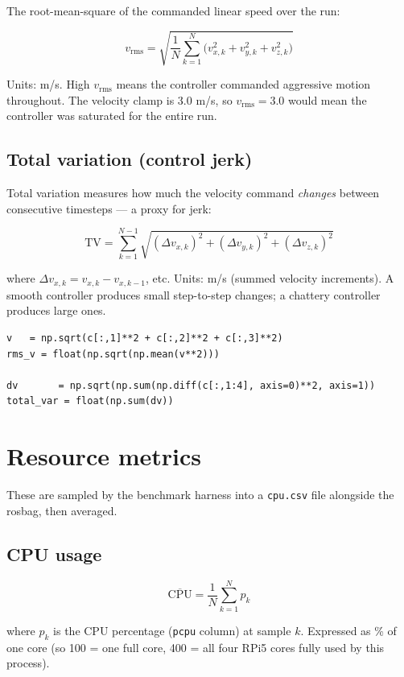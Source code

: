 \documentclass[11pt,a4paper]{article}
\begin{document}
The root-mean-square of the commanded linear speed over the run:

\[
  v_{\mathrm{rms}} = \sqrt{\frac{1}{N} \sum_{k=1}^{N} \bigl(v_{x,k}^2 + v_{y,k}^2 + v_{z,k}^2\bigr)}
\]

Units: m/s.  High $v_{\mathrm{rms}}$ means the controller commanded aggressive
motion throughout.  The velocity clamp is 3.0 m/s, so $v_{\mathrm{rms}} = 3.0$
would mean the controller was saturated for the entire run.

\subsection{Total variation (control jerk)}

Total variation measures how much the velocity command \emph{changes} between
consecutive timesteps --- a proxy for jerk:

\[
  \mathrm{TV} = \sum_{k=1}^{N-1}
      \sqrt{(\Delta v_{x,k})^2 + (\Delta v_{y,k})^2 + (\Delta v_{z,k})^2}
\]

where $\Delta v_{x,k} = v_{x,k} - v_{x,k-1}$, etc.
Units: m/s (summed velocity increments).  A smooth controller produces small
step-to-step changes; a chattery controller produces large ones.

\begin{lstlisting}
v   = np.sqrt(c[:,1]**2 + c[:,2]**2 + c[:,3]**2)
rms_v = float(np.sqrt(np.mean(v**2)))

dv       = np.sqrt(np.sum(np.diff(c[:,1:4], axis=0)**2, axis=1))
total_var = float(np.sum(dv))
\end{lstlisting}

\section{Resource metrics}

These are sampled by the benchmark harness into a \texttt{cpu.csv} file
alongside the rosbag, then averaged.

\subsection{CPU usage}

\[
  \overline{\mathrm{CPU}} = \frac{1}{N} \sum_{k=1}^{N} p_k
\]

where $p_k$ is the CPU percentage (\texttt{pcpu} column) at sample $k$.
Expressed as \% of one core (so 100 = one full core, 400 = all four
RPi5 cores fully used by this process).
\end{document}
